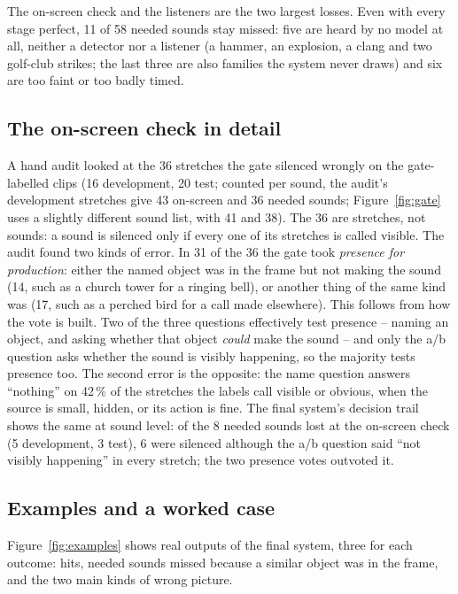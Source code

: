 The on-screen check and the listeners are the two largest losses. Even with every stage perfect, 11 of 58 needed
sounds stay missed: five are heard by no model at all, neither a detector nor a listener (a hammer, an explosion, a clang and two golf-club strikes; the last three are also families the system never draws)
and six are too faint or too badly timed.

\subsection{The on-screen check in detail}\label{sec:presence}
A hand audit looked at the 36 stretches the gate silenced wrongly on the gate-labelled clips (16 development, 20 test;
counted per sound, the audit's development stretches give 43 on-screen and 36 needed sounds; Figure~\ref{fig:gate}
uses a slightly different sound list, with 41 and 38). The 36 are stretches, not sounds: a sound is silenced only if every one of its stretches is called visible. The audit found two kinds of error. In 31 of the 36 the gate took \emph{presence for production}: either the named object was in the frame but not
making the sound (14, such as a church tower for a ringing bell), or another thing of the same kind was (17, such as a
perched bird for a call made elsewhere). This follows from
how the vote is built. Two of the three questions effectively test presence -- naming an object, and asking whether that
object \emph{could} make the sound -- and only the a/b question asks whether the sound is visibly happening, so the
majority tests presence too. The second error is the opposite: the name question answers ``nothing'' on 42\,\% of the
stretches the labels call visible or obvious, when the source is small, hidden, or its action is fine.
The final system's decision trail shows the same at sound level: of the 8 needed sounds lost at the on-screen check
(5 development, 3 test), 6 were silenced although the a/b question said ``not visibly happening'' in every stretch;
the two presence votes outvoted it.

\subsection{Examples and a worked case}
Figure~\ref{fig:examples} shows real outputs of the final system, three for each outcome: hits, needed sounds missed
because a similar object was in the frame, and the two main kinds of wrong picture.

